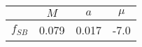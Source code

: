 \begin{tabular}{c||c|c|c}
 & $M$ & $a$ & $\mu$  \\
\hline
$f_{SB}$  & 0.079 & 0.017 & -7.0\\
\end{tabular}
